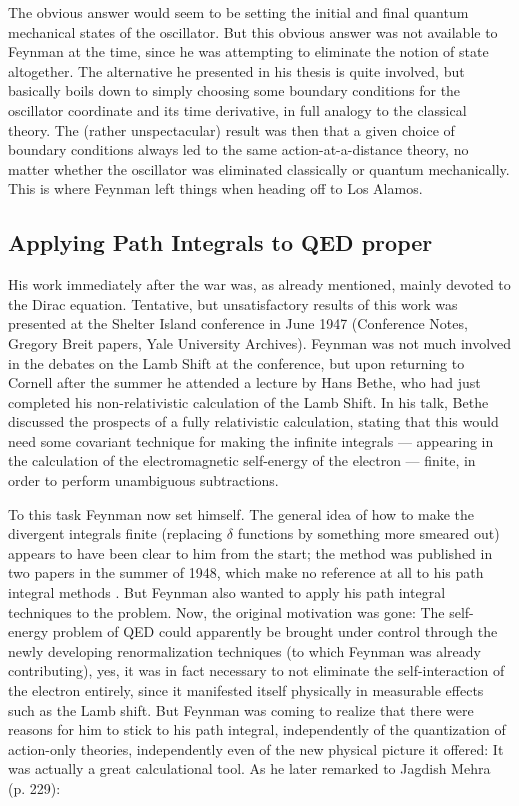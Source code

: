 \documentclass[12pt]{article}
\begin{document}
The obvious answer would seem to be setting the initial and final quantum mechanical states of the oscillator. But this obvious answer was not available to Feynman at the time, since he was attempting to eliminate the notion of state altogether. The alternative he presented in his thesis is quite involved, but basically boils down to simply choosing some boundary conditions for the oscillator coordinate and its time derivative, in full analogy to the classical theory. The (rather unspectacular) result was then that a given choice of boundary conditions always led to the same action-at-a-distance theory, no matter whether the oscillator was eliminated classically or quantum mechanically. This is where Feynman left things when heading off to Los Alamos. 

\subsection{Applying Path Integrals to QED proper}

His work immediately after the war was, as already mentioned, mainly devoted to the Dirac equation. Tentative, but unsatisfactory results of this work was presented at the Shelter Island conference in June 1947 (Conference Notes, Gregory Breit papers, Yale University Archives). Feynman was not much involved in the debates on the Lamb Shift at the conference, but upon returning to Cornell after the summer he attended a lecture by Hans Bethe, who had just completed his non-relativistic calculation of the Lamb Shift. In his talk, Bethe discussed the prospects of a fully relativistic calculation, stating that this would need some covariant technique for making the infinite integrals --- appearing in the calculation of the electromagnetic self-energy of the electron --- finite, in order to perform unambiguous subtractions.

To this task Feynman now set himself. The general idea of how to make the divergent integrals finite (replacing $\delta$ functions by something more smeared out) appears to have been clear to him from the start; the method was published in two papers in the summer of 1948, which make no reference at all to his path integral methods \citep{feynman_1948_a-relativistic, feynman_1948_relativistic}. But Feynman also wanted to apply his path integral techniques to the problem. Now, the original motivation was gone: The self-energy problem of QED could apparently be brought under control through the newly developing renormalization techniques (to which Feynman was already contributing), yes, it was in fact necessary to not eliminate the self-interaction of the electron entirely, since it manifested itself physically in measurable effects such as the Lamb shift. But Feynman was coming to realize that there were reasons for him to stick to his path integral, independently of the quantization of action-only theories, independently even of the new physical picture it offered: It was actually a great calculational tool. As he later remarked to Jagdish Mehra (p. 229):
\end{document}
